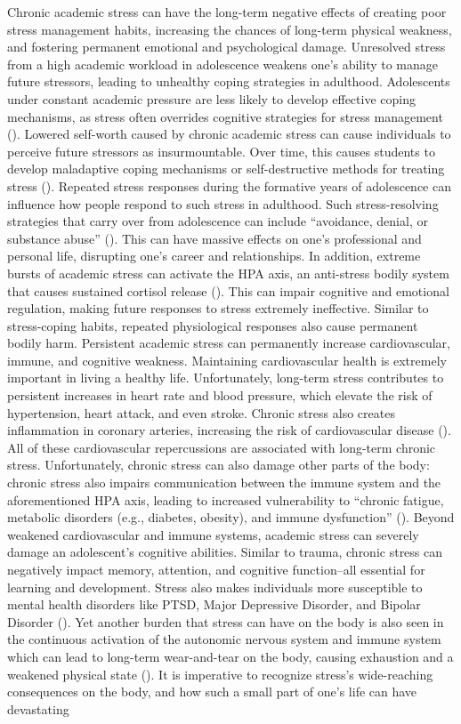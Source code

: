 Chronic academic stress can have the long-term negative effects of creating poor stress management habits, increasing the chances of long-term physical weakness, and fostering permanent emotional and psychological damage. Unresolved stress from a high academic workload in adolescence weakens one’s ability to manage future stressors, leading to unhealthy coping strategies in adulthood. Adolescents under constant academic pressure are less likely to develop effective coping mechanisms, as stress often overrides cognitive strategies for stress management (\cite{chen2024}). Lowered self-worth caused by chronic academic stress can cause individuals to perceive future stressors as insurmountable. Over time, this causes students to develop maladaptive coping mechanisms or self-destructive methods for treating stress (\cite{cordovaolivera2023}). Repeated stress responses during the formative years of adolescence can influence how people respond to such stress in adulthood. Such stress-resolving strategies that carry over from adolescence can include “avoidance, denial, or substance abuse” (\cite{claney2023}). This can have massive effects on one’s professional and personal life, disrupting one’s career and relationships. In addition, extreme bursts of academic stress can activate the HPA axis, an anti-stress bodily system that causes sustained cortisol release (\cite{cordovaolivera2023}). This can impair cognitive and emotional regulation, making future responses to stress extremely ineffective. Similar to stress-coping habits, repeated physiological responses also cause permanent bodily harm. Persistent academic stress can permanently increase cardiovascular, immune, and cognitive weakness. Maintaining cardiovascular health is extremely important in living a healthy life. Unfortunately, long-term stress contributes to persistent increases in heart rate and blood pressure, which elevate the risk of hypertension, heart attack, and even stroke. Chronic stress also creates inflammation in coronary arteries, increasing the risk of cardiovascular disease (\cite{almroth2019}). All of these cardiovascular repercussions are associated with long-term chronic stress. Unfortunately, chronic stress can also damage other parts of the body: chronic stress also impairs communication between the immune system and the aforementioned HPA axis, leading to increased vulnerability to “chronic fatigue, metabolic disorders (e.g., diabetes, obesity), and immune dysfunction” (\cite{sha2023}). Beyond weakened cardiovascular and immune systems, academic stress can severely damage an adolescent’s cognitive abilities. Similar to trauma, chronic stress can negatively impact memory, attention, and cognitive function–all essential for learning and development. Stress also makes individuals more susceptible to mental health disorders like PTSD, Major Depressive Disorder, and Bipolar Disorder (\cite{claney2023}). Yet another burden that stress can have on the body is also seen in the continuous activation of the autonomic nervous system and immune system which can lead to long-term wear-and-tear on the body, causing exhaustion and a weakened physical state (\cite{almroth2019}). It is imperative to recognize stress’s wide-reaching consequences on the body, and how such a small part of one’s life can have devastating 
